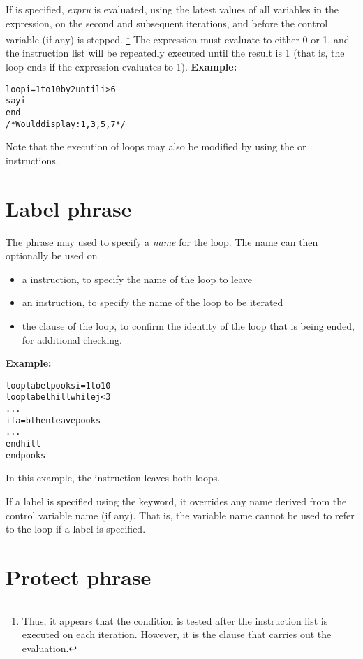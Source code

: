 \begin{description}
If  is specified, \emph{expru} is evaluated, using the
latest values of all variables in the expression, on the second and
subsequent iterations, and before the control variable (if any) is stepped.
\footnote{
Thus, it appears that the  condition is tested after the
instruction list is executed on each iteration.
However, it is the  clause that carries out the evaluation.
}
The expression must evaluate to either 0 or 1, and the instruction list
will be repeatedly executed until the result is 1 (that is, the loop
ends if the expression evaluates to 1).
 \textbf{Example:}
\begin{alltt}
loop i=1 to 10 by 2 until i>6
  say i
  end
/* Would display: 1, 3, 5, 7 */
\end{alltt}
\end{description}
 Note that the execution of loops may also be modified by
using the  or  instructions.
\section{Label phrase}
 
The  phrase may used to specify a \emph{name} for the
loop.  The name can then optionally be used on
\begin{itemize}
\item a  instruction, to specify the name of the loop to leave
\item an  instruction, to specify the name of the loop to
be iterated
\item the  clause of the loop, to confirm the identity of the
loop that is being ended, for additional checking.
\end{itemize}
 \textbf{Example:}
\begin{alltt}
loop label pooks i=1 to 10
  loop label hill while j<3
    ...
    if a=b then leave pooks
    ...
    end hill
  end pooks
\end{alltt}
In this example, the  instruction leaves both loops.
 
If a label is specified using the  keyword, it overrides
any name derived from the control variable name (if any).  That is, the
variable name cannot be used to refer to the loop if a label is
specified.
\section{Protect phrase}
 
